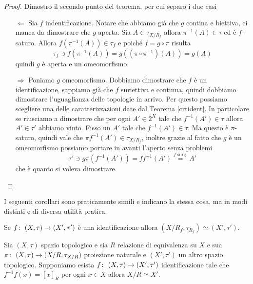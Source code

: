 \begin{proof}
	Dimostro il secondo punto del teorema, per cui separo i due casi
	\begin{enumerate}
		\item[$\Leftarrow$] Sia $f$ indentificazione. Notare che abbiamo già che $g$ contina e biettiva, ci manca da dimostrare che $g$ aperta.  Sia $A \in \tau_{X/R_f}$ allora $\pi^{-1}(A) \in \tau$ ed è $f$-saturo. Allora $f(\pi^{-1}(A)) \in \tau_f$ e poiché $f = g \circ \pi$ risulta 
		\begin{equation*}
			 \tau_f \ni f(\pi^{-1}(A)) = g ((\pi \circ \pi^{-1})(A)) = g(A)
		\end{equation*}
		quindi $g$ è aperta e un omeomorfismo.
		\item[$\Rightarrow$] Poniamo $g$ omeomorfismo. Dobbiamo dimostrare che $f$ è un identificazione, sappiamo già che $f$ suriettiva e continua, quindi dobbiamo dimostrare l'uguaglianza delle  topologie in arrivo. Per questo possiamo scegliere una delle caratterizzazioni date dal Teorema \ref{crtident}. In particolare se riusciamo a dimostrare che per ogni $A' \in 2^X$ tale che $f^{-1}(A') \in \tau$ allora $A' \in \tau'$ abbiamo vinto. Fisso un $A'$ tale che $f^{-1}(A') \in \tau$. Ma questo è $\pi$-saturo, quindi vale che $\pi f^{-1} (A') \in \tau_{X/R_f}$, inoltre grazie al fatto che $g$ è un omeomorfismo possiamo portare in avanti l'aperto senza problemi
		\begin{equation*}
			\tau' \ni g\pi (f^{-1}(A')) = ff^{-1}(A') \overset{f \; \text{surg.}}{=} A' 
		\end{equation*}
		che è quanto si voleva dimostrare.
	\end{enumerate}
\end{proof}

I seguenti corollari sono praticamente simili e indicano la stessa cosa, ma in modi distinti e di diversa utilità pratica. 

\begin{corollary}
	Se $f \colon\ (X,\tau) \rightarrow (X',\tau')$ è una identificazione allora $(X/R_f, \tau_{R_f}) \simeq (X', \tau')$. 
\end{corollary}

\begin{corollary}
	Sia $(X,\tau)$ spazio topologico e sia $R$ relazione di equivalenza su $X$ e sua $\pi \colon\ (X,\tau) \rightarrow (X/R, \tau_{X/R})$ proiezione naturale e $(X', \tau')$ un altro spazio topologico. Supponiamo esista $f \colon\ (X,\tau) \rightarrow (X',\tau')$ identificazione tale che $f^{-1}f(x) = \left[x\right]_R$ per ogni $x \in X$ allora $X/R \simeq X'$.
\end{corollary}

